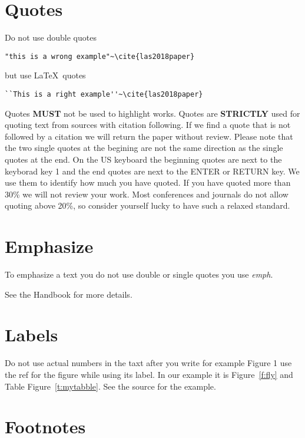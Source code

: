 \section{Quotes}

Do not use double quotes 

\begin{verbatim}
"this is a wrong example"~\cite{las2018paper} 
\end{verbatim}

but use \LaTeX\ quotes

\begin{verbatim}
``This is a right example''~\cite{las2018paper}
\end{verbatim}


Quotes {\bf MUST} not be used to highlight works. Quotes are {\bf
  STRICTLY} used for quoting text from sources with citation
following. If we find a quote that is not followed by a citation we
will return the paper without review. Please note that the two single
quotes at the begining are not the same direction as the single quotes
at the end. On the US keyboard the beginning quotes are next to the
keyborad key 1 and the end quotes are next to the ENTER or RETURN
key. We use them to identify how much you have quoted. If you have
quoted more than 30\% we will not review your work. Most conferences
and journals do not allow quoting above 20\%, so consider yourself
lucky to have such a relaxed standard. 

\section{Emphasize}

To emphasize a text you do not use double or single quotes you use
\emph{emph}.

See the Handbook for more details.


\section{Labels}

Do not use actual numbers in the taxt after you write for example
Figure 1 use the ref for the figure while using its label. In our
example it is Figure~\ref{f:fly} and Table Figure~\ref{t:mytabble}.
See the source for the example.

\section{Footnotes}

